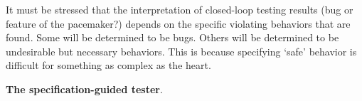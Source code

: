 It must be stressed that the interpretation of closed-loop testing results (bug or feature of the pacemaker?) depends on the specific violating behaviors that are found.
Some will be determined to be bugs. 
Others will be determined to be undesirable but necessary behaviors.
This is because specifying `safe' behavior is difficult for something as complex as the heart.

\textbf{The specification-guided tester}.





